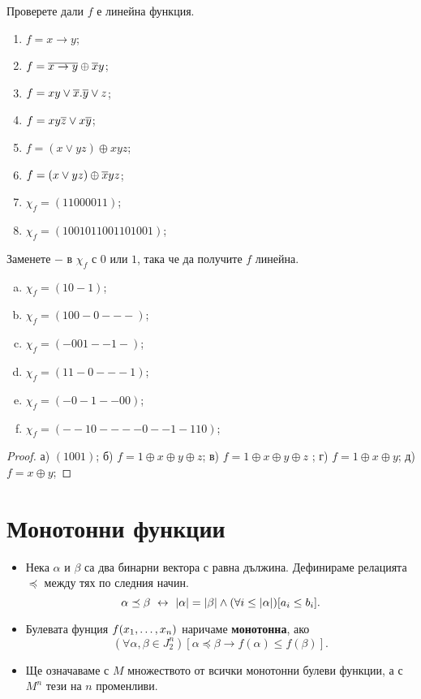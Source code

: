 \begin{problem}
  Проверете дали $f$ е линейна функция.
  \begin{enumerate}
  \item
    $f = x\rightarrow y$;
  \item
    $f = \overline{x\rightarrow y}\oplus \overline{x}y$;
  \item
    $f = xy\vee \overline{x}.\overline{y}\vee z$;
  \item
    $f = xy\overline{z}\vee x\overline{y}$;
  \item
    $f = (x\vee yz)\oplus xyz$;
  \item
    $f = (x\vee yz)\oplus \overline{x}yz$;
  \item
    $\chi_f = (1100 0011)$;
  \item
    $\chi_f = (1001 0110 0110 1001)$;
  \end{enumerate}
\end{problem}

\begin{problem}
  Заменете $-$ в $\chi_f$ с $0$ или $1$, така че да получите $f$ линейна.
  \begin{enumerate}[a)]
  \item
    $\chi_f = (10-1)$;
  \item
    $\chi_f = (100-0---)$;
  \item
    $\chi_f = (-001--1-)$;
  \item
    $\chi_f = (11-0---1)$;
  \item
    $\chi_f = (-0-1--00)$;
  \item
    $\chi_f = (--10----0--1-110)$;
  \end{enumerate}
\end{problem}
\begin{proof}
  а) $(1001)$; б) $f = 1\oplus x \oplus y\oplus z$; в) $f = 1\oplus x\oplus y\oplus z$ ;
  г) $f = 1\oplus x\oplus y$; д) $f = x\oplus y$;
\end{proof}


\section{Монотонни функции}

\begin{itemize}
\item 
  Нека $\alpha$ и $\beta$ са два бинарни вектора с равна дължина.
  Дефинираме релацията $\preceq$ между тях по следния начин.
  \[\alpha \preceq \beta \ \leftrightarrow\  \lvert{\alpha}\rvert = \lvert{\beta}\rvert\wedge (\forall i \leq \lvert{\alpha}\rvert)[a_i \leq b_i].\]
\item
  Булевата фунция $f(x_{1},\dots,x_{n})$ наричаме {\bf монотонна}, ако 
  \[(\forall \alpha,\beta\in J^n_2 )[\alpha\preceq\beta \rightarrow f(\alpha) \leq f(\beta)].\]  
\item
  Ще означаваме с $M$ множеството от всички монотонни булеви функции, а с $M^n$ тези на $n$ променливи.
\end{itemize}

